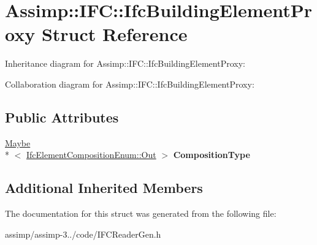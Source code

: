 \hypertarget{struct_assimp_1_1_i_f_c_1_1_ifc_building_element_proxy}{\section{Assimp\+:\+:I\+F\+C\+:\+:Ifc\+Building\+Element\+Proxy Struct Reference}
\label{struct_assimp_1_1_i_f_c_1_1_ifc_building_element_proxy}
}


Inheritance diagram for Assimp\+:\+:I\+F\+C\+:\+:Ifc\+Building\+Element\+Proxy\+:


Collaboration diagram for Assimp\+:\+:I\+F\+C\+:\+:Ifc\+Building\+Element\+Proxy\+:
\subsection*{Public Attributes}
\begin{DoxyCompactItemize}
\item 
\hypertarget{struct_assimp_1_1_i_f_c_1_1_ifc_building_element_proxy_ac93d06ed93981c3300241feec4aa06a3}{\hyperlink{struct_assimp_1_1_s_t_e_p_1_1_maybe}{Maybe}\\*
$<$ \hyperlink{classboost_1_1shared__ptr}{Ifc\+Element\+Composition\+Enum\+::\+Out} $>$ {\bfseries Composition\+Type}}\label{struct_assimp_1_1_i_f_c_1_1_ifc_building_element_proxy_ac93d06ed93981c3300241feec4aa06a3}

\end{DoxyCompactItemize}
\subsection*{Additional Inherited Members}


The documentation for this struct was generated from the following file\+:\begin{DoxyCompactItemize}
\item 
assimp/assimp-\/3../code/I\+F\+C\+Reader\+Gen.\+h\end{DoxyCompactItemize}
